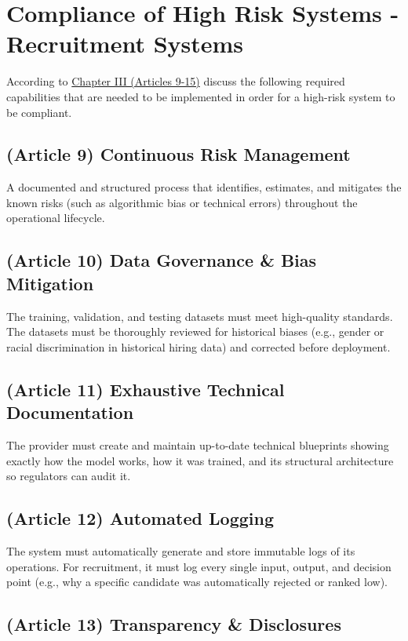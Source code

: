 \documentclass[a4paper, 12pt]{article}
\begin{document}
\section{Compliance of High Risk Systems - Recruitment Systems}

According to \href{https://eur-lex.europa.eu/legal-content/EN/TXT/?uri=CELEX%3A32024R1689}{Chapter III (Articles 9-15)} discuss the following required capabilities that are needed to be implemented in order for a high-risk system to be compliant.

\subsection{(Article 9) Continuous Risk Management}

A documented and structured process that identifies, estimates, and mitigates the known risks (such as algorithmic bias or technical errors) throughout the operational lifecycle.

\subsection{(Article 10) Data Governance \& Bias Mitigation}

The training, validation, and testing datasets must meet high-quality standards. The datasets must be thoroughly reviewed for historical biases (e.g., gender or racial discrimination in historical hiring data) and corrected before deployment.

\subsection{(Article 11) Exhaustive Technical Documentation}

The provider must create and maintain up-to-date technical blueprints showing exactly how the model works, how it was trained, and its structural architecture so regulators can audit it.

\subsection{(Article 12) Automated Logging}

The system must automatically generate and store immutable logs of its operations. For recruitment, it must log every single input, output, and decision point (e.g., why a specific candidate was automatically rejected or ranked low).

\subsection{(Article 13) Transparency \& Disclosures}
\end{document}
